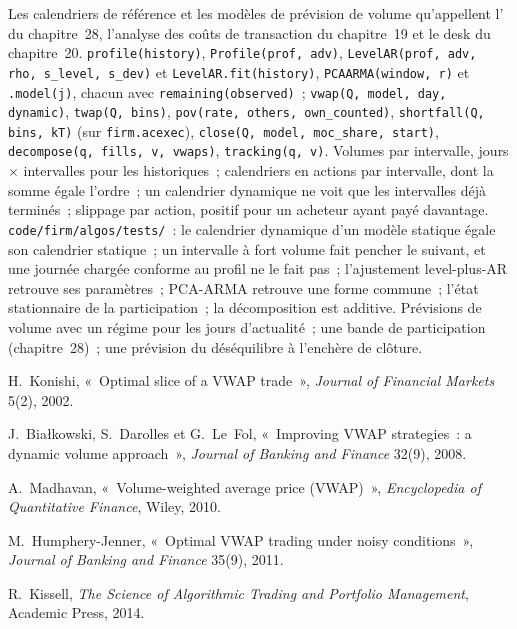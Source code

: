 \begin{build}
 Les calendriers de référence et les modèles de prévision de volume qu'appellent l' du chapitre~28, l'analyse des coûts de transaction du
chapitre~19 et le desk du chapitre~20.
 \texttt{profile(history)}, \texttt{Profile(prof, adv)}, \texttt{LevelAR(prof, adv, rho, s\_level, s\_dev)} et
\texttt{LevelAR.fit(history)}, \texttt{PCAARMA(window, r)} et \texttt{.model(j)}, chacun avec \texttt{remaining(observed)}~;
\texttt{vwap(Q, model, day, dynamic)}, \texttt{twap(Q, bins)}, \texttt{pov(rate, others, own\_counted)}, \texttt{shortfall(Q, bins, kT)} (sur
\texttt{firm.acexec}), \texttt{close(Q, model, moc\_share, start)}, \texttt{decompose(q, fills, v, vwaps)}, \texttt{tracking(q, v)}.
 Volumes par intervalle, jours $\times$ intervalles pour les historiques~; calendriers en actions par intervalle, dont la somme égale l'ordre~; un calendrier dynamique ne voit que les intervalles
déjà terminés~; slippage par action, positif pour un acheteur ayant payé davantage.
 \texttt{code/firm/algos/tests/}~: le calendrier dynamique d'un modèle statique égale son calendrier statique~; un intervalle à fort volume fait pencher le suivant, et une
journée chargée conforme au profil ne le fait pas~; l'ajustement level-plus-AR retrouve ses paramètres~; PCA-ARMA retrouve une forme commune~; l'état stationnaire de la participation~; la
décomposition est additive.
 Prévisions de volume avec un régime pour les jours d'actualité~; une bande de participation (chapitre~28)~; une prévision du déséquilibre à l'enchère de clôture.
\end{build}

\begin{omsources}
\item H.~Konishi, «~Optimal slice of a VWAP trade~», \emph{Journal of Financial Markets} 5(2), 2002.
\item J.~Białkowski, S.~Darolles et G.~Le~Fol, «~Improving VWAP strategies~: a dynamic volume approach~», \emph{Journal of Banking and Finance}
32(9), 2008.
\item A.~Madhavan, «~Volume-weighted average price (VWAP)~», \emph{Encyclopedia of Quantitative Finance}, Wiley, 2010.
\item M.~Humphery-Jenner, «~Optimal VWAP trading under noisy conditions~», \emph{Journal of Banking and Finance} 35(9), 2011.
\item R.~Kissell, \emph{The Science of Algorithmic Trading and Portfolio Management}, Academic Press, 2014.
\end{omsources}

